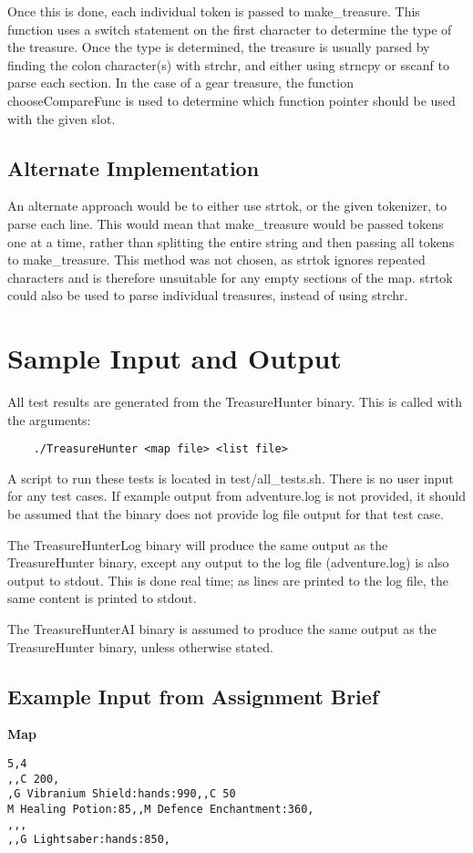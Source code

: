 \documentclass{article}
\begin{document}
Once this is done, each individual token is passed to make\_treasure. This function
uses a switch statement on the first character to determine the type of the treasure.
Once the type is determined, the treasure is usually parsed by finding the colon character(s)
with strchr, and either using strncpy or sscanf to parse each section.
In the case of a gear treasure,
the function chooseCompareFunc is used to determine which function pointer should be used
with the given slot.

\subsection{Alternate Implementation}

An alternate approach would be to either use strtok, or the given tokenizer, to parse each line.
This would mean that make\_treasure would be passed tokens one at a time, rather than splitting the entire
string and then passing all tokens to make\_treasure. This method was not chosen, as strtok ignores repeated
characters and is therefore unsuitable for any empty sections of the map. strtok could also be used to parse
individual treasures, instead of using strchr.


\section{Sample Input and Output}
All test results are generated from the TreasureHunter binary.
This is called with the arguments:
\begin{lstlisting}
    ./TreasureHunter <map file> <list file>
\end{lstlisting}
A script to run these tests is located in test/all\_tests.sh.
There is no user input for any test cases.
If example output from adventure.log is not provided, it should be assumed that the binary
does not provide log file output for that test case.

The TreasureHunterLog binary will produce the same output as the TreasureHunter binary,
except any output to the log file (adventure.log) is also output to stdout. This is done
real time; as lines are printed to the log file, the same content is printed to stdout.

The TreasureHunterAI binary is assumed to produce the same output as the TreasureHunter binary,
unless otherwise stated.

\subsection{Example Input from Assignment Brief}
\quad \textbf{Map}
\begin{lstlisting}
5,4
,,C 200,
,G Vibranium Shield:hands:990,,C 50
M Healing Potion:85,,M Defence Enchantment:360,
,,,
,,G Lightsaber:hands:850,
\end{lstlisting}
\end{document}
